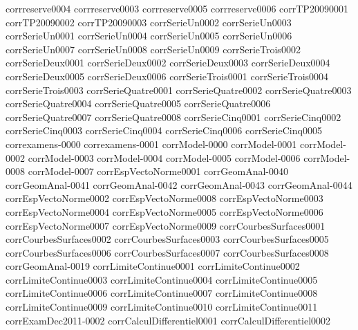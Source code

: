 {corrreserve0004}
{corrreserve0003}
{corrreserve0005}
{corrreserve0006}
{corrTP20090001}
{corrTP20090002}
{corrTP20090003}
{corrSerieUn0002}
{corrSerieUn0003}
{corrSerieUn0001}
{corrSerieUn0004}
{corrSerieUn0005}
{corrSerieUn0006}
{corrSerieUn0007}
{corrSerieUn0008}
{corrSerieUn0009}
{corrSerieTrois0002}
{corrSerieDeux0001}
{corrSerieDeux0002}
{corrSerieDeux0003}
{corrSerieDeux0004}
{corrSerieDeux0005}
{corrSerieDeux0006}
{corrSerieTrois0001}
{corrSerieTrois0004}
{corrSerieTrois0003}
{corrSerieQuatre0001}
{corrSerieQuatre0002}
{corrSerieQuatre0003}
{corrSerieQuatre0004}
{corrSerieQuatre0005}
{corrSerieQuatre0006}
{corrSerieQuatre0007}
{corrSerieQuatre0008}
{corrSerieCinq0001}
{corrSerieCinq0002}
{corrSerieCinq0003}
{corrSerieCinq0004}
{corrSerieCinq0006}
{corrSerieCinq0005}
{correxamens-0000}
{correxamens-0001}
{corrModel-0000}
{corrModel-0001}
{corrModel-0002}
{corrModel-0003}
{corrModel-0004}
{corrModel-0005}
{corrModel-0006}
{corrModel-0008}
{corrModel-0007}
{corrEspVectoNorme0001}
{corrGeomAnal-0040}
{corrGeomAnal-0041}
{corrGeomAnal-0042}
{corrGeomAnal-0043}
{corrGeomAnal-0044}
{corrEspVectoNorme0002}
{corrEspVectoNorme0008}
{corrEspVectoNorme0003}
{corrEspVectoNorme0004}
{corrEspVectoNorme0005}
{corrEspVectoNorme0006}
{corrEspVectoNorme0007}
{corrEspVectoNorme0009}
{corrCourbesSurfaces0001}
{corrCourbesSurfaces0002}
{corrCourbesSurfaces0003}
{corrCourbesSurfaces0005}
{corrCourbesSurfaces0006}
{corrCourbesSurfaces0007}
{corrCourbesSurfaces0008}
{corrGeomAnal-0019}
{corrLimiteContinue0001}
{corrLimiteContinue0002}
{corrLimiteContinue0003}
{corrLimiteContinue0004}
{corrLimiteContinue0005}
{corrLimiteContinue0006}
{corrLimiteContinue0007}
{corrLimiteContinue0008}
{corrLimiteContinue0009}
{corrLimiteContinue0010}
{corrLimiteContinue0011}
{corrExamDec2011-0002}
{corrCalculDifferentiel0001}
{corrCalculDifferentiel0002}
